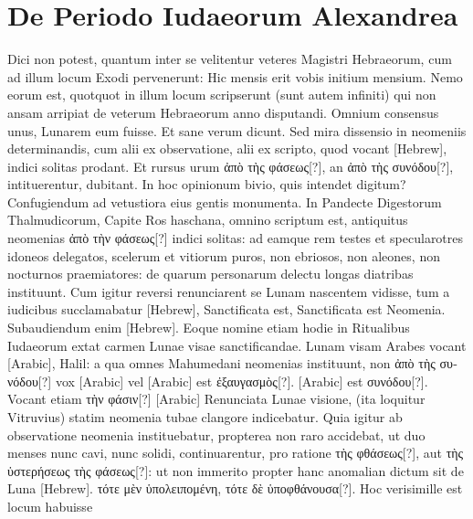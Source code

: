 \section{De Periodo Iudaeorum Alexandrea}
%
Dici non potest, quantum inter se velitentur veteres Magistri
Hebraeorum, cum ad illum locum Exodi  pervenerunt:
Hic mensis erit vobis initium mensium.
Nemo eorum est,
quotquot in illum locum scripserunt (sunt autem infiniti) qui non ansam
arripiat de veterum Hebraeorum anno disputandi.
Omnium
consensus unus, Lunarem eum fuisse.
Et sane verum dicunt.
Sed mira
dissensio in neomeniis determinandis, cum alii ex observatione, alii ex
scripto, quod vocant \texthebrew{[Hebrew]}, indici solitas prodant.
Et rursus urum
\textgreek{ἀπὸ τὴς φάσεως[?]}, an \textgreek{ἀπὸ τὴς συνόδου[?]},
 intituerentur, dubitant.
In hoc opinionum bivio, quis intendet digitum?
Confugiendum ad vetustiora
eius gentis monumenta.
In Pandecte Digestorum Thalmudicorum,
Capite Ros haschana, omnino scriptum est, antiquitus
neomenias \textgreek{ἀπὸ τὴν φάσεως[?]} indici solitas: ad eamque rem testes et
specularotres idoneos delegatos, scelerum et vitiorum puros, non
ebriosos, non aleones, non nocturnos praemiatores: de quarum personarum
delectu longas diatribas instituunt.
Cum igitur reversi renunciarent
se Lunam nascentem vidisse, tum a iudicibus succlamabatur
\texthebrew{[Hebrew]}, Sanctificata est, Sanctificata est Neomenia.
Subaudiendum
enim \texthebrew{[Hebrew]}.
Eoque nomine etiam hodie in Ritualibus Iudaeorum
extat carmen Lunae visae sanctificandae.
Lunam visam Arabes
vocant \textarabic{[Arabic]}, Halil: a qua omnes Mahumedani
 neomenias instituunt,
non \textgreek{ἀπὸ τὴς συνόδου[?]} vox \textarabic{[Arabic]} vel
 \textarabic{[Arabic]} est \textgreek{ἐξαυγασμὸς[?]}.
%
\textarabic{[Arabic]}
est \textgreek{συνόδου[?]}.
Vocant etiam \textgreek{τὴν φάσιν[?]} \textarabic{[Arabic]}
Renunciata Lunae visione,
(ita loquitur Vitruvius) statim neomenia tubae clangore indicebatur.
Quia igitur ab observatione neomenia instituebatur, propterea non raro
accidebat, ut duo menses nunc cavi, nunc solidi, continuarentur, pro
ratione \textgreek{τὴς φθάσεως[?]},
 aut \textgreek{τὴς ὑστερήσεως τὴς φάσεως[?]}: ut non immerito propter
hanc anomalian dictum sit de Luna \texthebrew{[Hebrew]}.
\textgreek{τότε
μὲν ὑπολειπομένη, τότε δὲ ὑποφθάνουσα[?]}.
Hoc verisimille est locum habuisse
